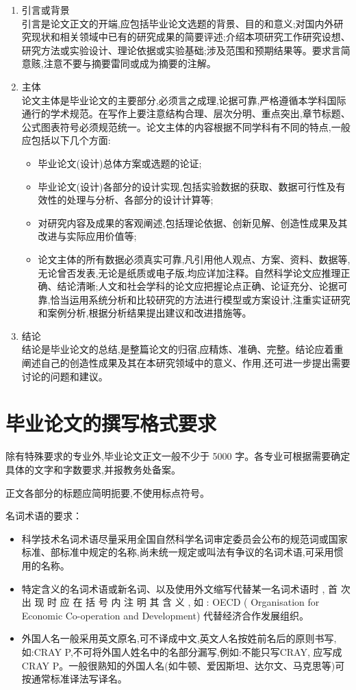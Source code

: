﻿\documentclass{sysuthesis}
\begin{document}
\begin{enumerate}
\item 引言或背景\\
引言是论文正文的开端,应包括毕业论文选题的背景、目的和意义;对国内外研究现状和相关领域中已有的研究成果的简要评述;介绍本项研究工作研究设想、研究方法或实验设计、理论依据或实验基础;涉及范围和预期结果等。要求言简意赅,注意不要与摘要雷同或成为摘要的注解。
\item 主体\\
论文主体是毕业论文的主要部分,必须言之成理,论据可靠,严格遵循本学科国际通行的学术规范。在写作上要注意结构合理、层次分明、重点突出,章节标题、公式图表符号必须规范统一。论文主体的内容根据不同学科有不同的特点,一般应包括以下几个方面:
\begin{itemize}
\item 毕业论文(设计)总体方案或选题的论证;
\item 毕业论文(设计)各部分的设计实现,包括实验数据的获取、数据可行性及有效性的处理与分析、各部分的设计计算等;
\item 对研究内容及成果的客观阐述,包括理论依据、创新见解、创造性成果及其改进与实际应用价值等;
\item 论文主体的所有数据必须真实可靠,凡引用他人观点、方案、资料、数据等,无论曾否发表,无论是纸质或电子版,均应详加注释。自然科学论文应推理正确、结论清晰;人文和社会学科的论文应把握论点正确、论证充分、论据可靠,恰当运用系统分析和比较研究的方法进行模型或方案设计,注重实证研究和案例分析,根据分析结果提出建议和改进措施等。
\end{itemize}
\item 结论\\
结论是毕业论文的总结,是整篇论文的归宿,应精炼、准确、完整。结论应着重阐述自己的创造性成果及其在本研究领域中的意义、作用,还可进一步提出需要讨论的问题和建议。
\end{enumerate}

\section{毕业论文的撰写格式要求}

除有特殊要求的专业外,毕业论文正文一般不少于 5000 字。各专业可根据需要确定具体的文字和字数要求,并报教务处备案。

正文各部分的标题应简明扼要,不使用标点符号。

名词术语的要求：

\begin{itemize}
\item 科学技术名词术语尽量采用全国自然科学名词审定委员会公布的规范词或国家标准、部标准中规定的名称,尚未统一规定或叫法有争议的名词术语,可采用惯用的名称。
\item 特定含义的名词术语或新名词、以及使用外文缩写代替某一名词术语时 , 首 次 出 现 时 应 在 括 号 内 注 明 其 含 义 , 如 : OECD ( Organisation for Economic Co-operation and Development) 代替经济合作发展组织。
\item 外国人名一般采用英文原名,可不译成中文,英文人名按姓前名后的原则书写,如:CRAY P,不可将外国人姓名中的名部分漏写,例如:不能只写CRAY, 应写成 CRAY P。一般很熟知的外国人名(如牛顿、爱因斯坦、达尔文、马克思等)可按通常标准译法写译名。
\end{itemize}
\end{document}
